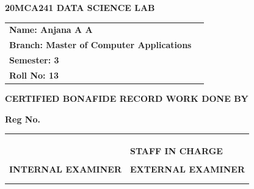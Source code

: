 \documentclass{report}
\theoremstyle{mytheor}
\begin{document}
\begin{titlepage}
\textbf{\Large 20MCA241 DATA SCIENCE LAB}
\vspace{0.45cm}

\begin{center}
\begin{tabular}{ll}
\vspace{0.45cm}

\textbf{\Large Name: Anjana A A} & \dotfill \\
\vspace{0.45cm}

\textbf{\Large Branch: Master of Computer Applications} & \dotfill \\
\vspace{0.45cm}

\textbf{\Large Semester: 3} & \dotfill \\
\vspace{0.45cm}

\textbf{\Large Roll No: 13} & \dotfill \\
\end{tabular}
\end{center}

\vspace{-0.2cm}

\textbf{\Large CERTIFIED BONAFIDE RECORD WORK DONE BY}

\vspace{0.6cm}

\textbf{\Large Reg No. } \dotfill

\begin{tabular}{ll}
& \\
& \\
& \\
\textbf{\Large } & \hspace{2.4cm} \textbf{\Large STAFF IN CHARGE} \\
\vspace{0.85cm}

& \\
\textbf{\Large INTERNAL EXAMINER} &  \hspace{2.5cm}\textbf{\Large EXTERNAL EXAMINER} \\
& \\
& \\
\end{tabular}
\end{titlepage}
\tableofcontents

\newpage
{}

\setcounter{page}{1}




%
%
%
%
%
%
%
%
%
\end{document}
